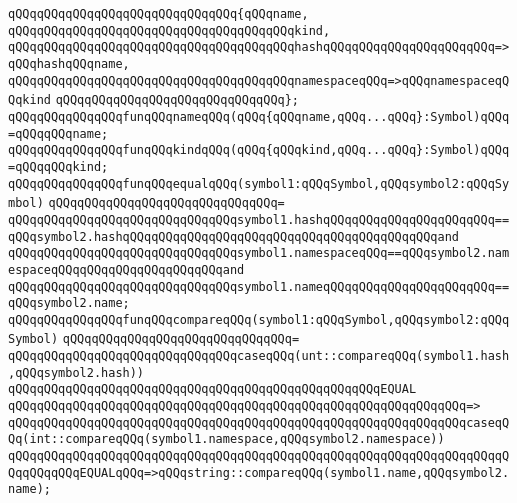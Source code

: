 \verb|qQQqqQQqqQQqqQQqqQQqqQQqqQQqqQQq{qQQqname,|\newline
\verb|qQQqqQQqqQQqqQQqqQQqqQQqqQQqqQQqqQQqqQQqkind,|\newline
\verb|qQQqqQQqqQQqqQQqqQQqqQQqqQQqqQQqqQQqqQQqhashqQQqqQQqqQQqqQQqqQQqqQQq=>qQQqhashqQQqname,|\newline
\verb|qQQqqQQqqQQqqQQqqQQqqQQqqQQqqQQqqQQqqQQqnamespaceqQQq=>qQQqnamespaceqQQqkind|\newline
\verb|qQQqqQQqqQQqqQQqqQQqqQQqqQQqqQQq};|\newline
\newline
\verb|qQQqqQQqqQQqqQQqfunqQQqnameqQQq(qQQq{qQQqname,qQQq...qQQq}:Symbol)qQQq=qQQqqQQqname;|\newline
\verb|qQQqqQQqqQQqqQQqfunqQQqkindqQQq(qQQq{qQQqkind,qQQq...qQQq}:Symbol)qQQq=qQQqqQQqkind;|\newline
\newline
\verb|qQQqqQQqqQQqqQQqfunqQQqequalqQQq(symbol1:qQQqSymbol,qQQqsymbol2:qQQqSymbol)|\newline
\verb|qQQqqQQqqQQqqQQqqQQqqQQqqQQqqQQq=|\newline
\verb|qQQqqQQqqQQqqQQqqQQqqQQqqQQqqQQqsymbol1.hashqQQqqQQqqQQqqQQqqQQqqQQq==qQQqsymbol2.hashqQQqqQQqqQQqqQQqqQQqqQQqqQQqqQQqqQQqqQQqqQQqand|\newline
\verb|qQQqqQQqqQQqqQQqqQQqqQQqqQQqqQQqsymbol1.namespaceqQQq==qQQqsymbol2.namespaceqQQqqQQqqQQqqQQqqQQqqQQqand|\newline
\verb|qQQqqQQqqQQqqQQqqQQqqQQqqQQqqQQqsymbol1.nameqQQqqQQqqQQqqQQqqQQqqQQq==qQQqsymbol2.name;|\newline
\newline
\verb|qQQqqQQqqQQqqQQqfunqQQqcompareqQQq(symbol1:qQQqSymbol,qQQqsymbol2:qQQqSymbol)|\newline
\verb|qQQqqQQqqQQqqQQqqQQqqQQqqQQqqQQq=|\newline
\verb|qQQqqQQqqQQqqQQqqQQqqQQqqQQqqQQqcaseqQQq(unt::compareqQQq(symbol1.hash,qQQqsymbol2.hash))|\newline
\newline
\verb|qQQqqQQqqQQqqQQqqQQqqQQqqQQqqQQqqQQqqQQqqQQqqQQqqQQqEQUAL|\newline
\verb|qQQqqQQqqQQqqQQqqQQqqQQqqQQqqQQqqQQqqQQqqQQqqQQqqQQqqQQqqQQqqQQq=>|\newline
\verb|qQQqqQQqqQQqqQQqqQQqqQQqqQQqqQQqqQQqqQQqqQQqqQQqqQQqqQQqqQQqqQQqcaseqQQq(int::compareqQQq(symbol1.namespace,qQQqsymbol2.namespace))|\newline
\verb|qQQqqQQqqQQqqQQqqQQqqQQqqQQqqQQqqQQqqQQqqQQqqQQqqQQqqQQqqQQqqQQqqQQqqQQqqQQqqQQqEQUALqQQq=>qQQqstring::compareqQQq(symbol1.name,qQQqsymbol2.name);|\newline
